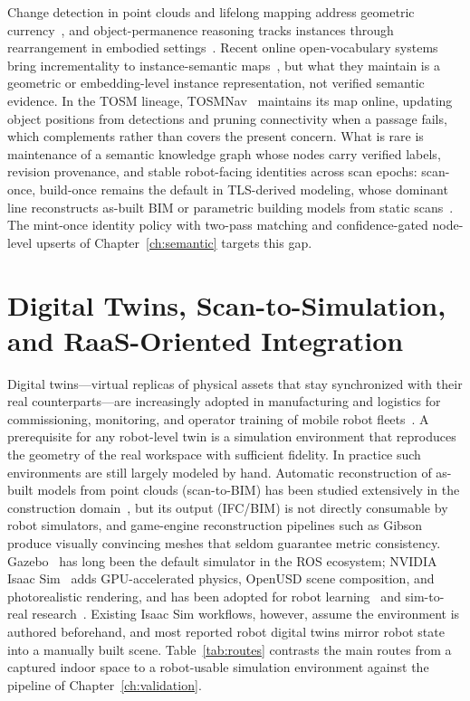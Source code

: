 Change detection in point clouds and lifelong mapping address geometric
currency~\cite{fehr2017tsdf}, and object-permanence reasoning tracks instances
through rearrangement in embodied settings~\cite{wald2019rescan}. Recent online
open-vocabulary systems bring incrementality to instance-semantic
maps~\cite{deng2026ovimap,zhai2026onlinepg,zhang2025funcgraph}, but what they
maintain is a geometric or embedding-level instance representation, not
verified semantic evidence. In the TOSM lineage, TOSMNav~\cite{joo2022fsom}
maintains its map online, updating object positions from detections and pruning
connectivity when a passage fails, which complements rather than covers the
present concern. What is rare is maintenance of a semantic knowledge graph
whose nodes carry verified labels, revision provenance, and stable robot-facing
identities across scan epochs: scan-once, build-once remains the default in
TLS-derived modeling, whose dominant line reconstructs as-built BIM or
parametric building models from static
scans~\cite{tang2010asbuilt,ochmann2016parametric,scan2bim}. The mint-once
identity policy with two-pass matching and confidence-gated node-level upserts
of Chapter~\ref{ch:semantic} targets this gap.

\section{Digital Twins, Scan-to-Simulation, and RaaS-Oriented Integration}
\label{sec:rw-digitaltwin}

Digital twins---virtual replicas of physical assets that stay synchronized
with their real counterparts---are increasingly adopted in manufacturing and
logistics for commissioning, monitoring, and operator training of mobile robot
fleets~\cite{tao2019}. A prerequisite for any robot-level twin is a simulation
environment that reproduces the geometry of the real workspace with sufficient
fidelity. In practice such environments are still largely modeled by hand.
Automatic reconstruction of as-built models from point clouds (scan-to-BIM) has
been studied extensively in the construction domain~\cite{scan2bim}, but its
output (IFC/BIM) is not directly consumable by robot simulators, and
game-engine reconstruction pipelines such as Gibson~\cite{gibson} produce
visually convincing meshes that seldom guarantee metric consistency.
Gazebo~\cite{koenig2004gazebo} has long been the default simulator in the ROS
ecosystem; NVIDIA Isaac Sim~\cite{isaacsim} adds GPU-accelerated physics,
OpenUSD scene composition, and photorealistic rendering, and has been adopted
for robot learning~\cite{orbit} and sim-to-real research~\cite{sim2real}.
Existing Isaac Sim workflows, however, assume the environment is authored
beforehand, and most reported robot digital twins mirror robot state into a
manually built scene. Table~\ref{tab:routes} contrasts the main routes from a
captured indoor space to a robot-usable simulation environment against the
pipeline of Chapter~\ref{ch:validation}.

